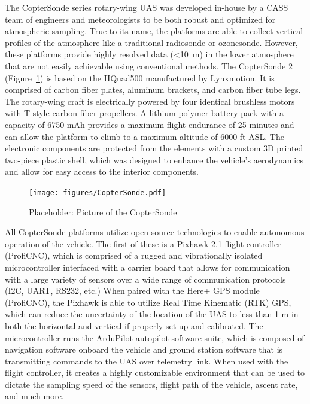 \documentclass[sensors,review,submit,moreauthors,pdftex,10pt,a4paper]{mdpi}
\theoremstyle{mdpi}
\newcounter{ex}
\newcounter{re}
\theoremstyle{mdpidefinition}
\begin{document}
The CopterSonde series rotary-wing UAS was developed in-house by a CASS team of engineers and meteorologists to be both robust and optimized for atmospheric sampling. True to its name, the platforms are able to collect vertical profiles of the atmosphere like a traditional radiosonde or ozonesonde. However, these platforms provide highly resolved data (<10~m) in the lower atmosphere that are not easily achievable using conventional methods. The CopterSonde 2 (Figure~\ref{fig:CopterSondePic}) is based on the HQuad500 manufactured by Lynxmotion. It is comprised of carbon fiber plates, aluminum brackets, and carbon fiber tube legs. The rotary-wing craft is electrically powered by four identical brushless motors with T-style carbon fiber propellers. A lithium polymer battery pack with a capacity of 6750 mAh provides a maximum flight endurance of 25 minutes and can allow the platform to climb to a maximum altitude of 6000 ft ASL. The electronic components are protected from the elements with a custom 3D printed two-piece plastic shell, which was designed to enhance the vehicle's aerodynamics and allow for easy access to the interior components.

\begin{figure}
\centering
\texttt{[image: figures/CopterSonde.pdf]}
\caption{\label{fig:CopterSondePic} Placeholder: Picture of the CopterSonde}
\end{figure}

All CopterSonde platforms utilize open-source technologies to enable autonomous operation of the vehicle. The first of these is a Pixhawk 2.1 flight controller (ProfiCNC), which is comprised of a rugged and vibrationally isolated microcontroller interfaced with a carrier board that allows for communication with a large variety of sensors over a wide range of communication protocols (I2C, UART, RS232, etc.) When paired with the Here+ GPS module (ProfiCNC), the Pixhawk is able to utilize Real Time Kinematic (RTK) GPS, which can reduce the uncertainty of the location of the UAS to less than 1 m in both the horizontal and vertical if properly set-up and calibrated. The microcontroller runs the ArduPilot autopilot software suite, which is composed of navigation software onboard the vehicle and ground station software that is transmitting commands to the UAS over telemetry link. When used with the flight controller, it creates a highly customizable environment that can be used to dictate the sampling speed of the sensors, flight path of the vehicle, ascent rate, and much more.
\end{document}
